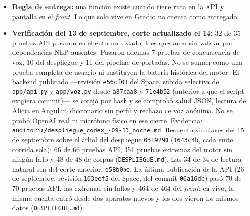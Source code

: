 \documentclass[11pt,a4paper]{article}
\newcommand{\cod}[1]{\texttt{\small #1}}
\begin{document}
\begin{itemize}
        viaja en una cabecera (\cod{X-Lector}) y sus datos siguen en el bucket montado en
        \cod{/data}. Desde el 26 de septiembre, quien entra con usuario y contraseña deja de ser un
        navegador: sus libros, sus palabras y su nivel pasan a ser \textbf{de la cuenta}
        (\cod{cuentas/}\emph{nombre} en el bucket) y se ven igual en el teléfono, la tableta
        o el equipo; sin cuenta siguen siendo de ese navegador. Salió de un caso real: con
        la misma cuenta, el teléfono y la tableta del autor enseñaban dos lectores
        distintos. El primer montaje falló ---el proxy de renderizado en servidor de
        Gradio no dejaba pasar \cod{/api}--- y el segundo, sin ese proxy, es el que está en
        marcha.
  \item \textbf{Regla de entrega:} una función existe cuando tiene ruta en la API
        \textbf{y} pantalla en el \emph{front}. Lo que solo vive en Gradio no cuenta como
        entregado.
  \item \textbf{Verificación del 13 de septiembre, corte actualizado el 14:} 32 de 35
        pruebas API pasaron en el entorno aislado; tres quedaron sin validar por
        dependencias NLP ausentes. Pasaron además 7 pruebas de concurrencia de voz,
        10 del despliegue y 11 del pipeline de portadas. No se suman como una prueba
        completa de usuario ni sustituyen la batería histórica del motor. El backend
        publicado ---revisión \cod{e56cf08} del Space, subida selectiva de \cod{app/api.py} y \cod{app/voz.py} desde \cod{a87caa8} y \cod{71e4b52} (anterior a que el script exigiera commit)--- se
        cotejó por hash y se comprobó salud JSON, lectura de
        Alicia en Angular, diccionario sin perfil y rechazo de voz anónima. No se probó
        OpenAI real ni micrófono físico en ese cierre. Evidencia:
        \cod{auditoria/\allowbreak despliegue\_codex\_-09-13\_noche.md}.
        Recuento sin claves del 15 de septiembre sobre el árbol del despliegue
        \cod{0319290} (\cod{1643c4b}, cada suite corrida sola): 66 de 66 pruebas API,
        351 pruebas extremas del motor sin ningún fallo y 48 de 48 de corpus
        (\cod{DESPLIEGUE.md}). Las 34 de 34 de lectura natural son del corte anterior,
        \cod{d58b0be}. La última publicación de la API (26 de septiembre, revisión
        \cod{103eef5} del Space, del commit \cod{06a16db}) pasó 70 de 70 pruebas API, las
        extremas sin fallos y 464 de 464 del \emph{front}; en vivo, la misma cuenta entró
        desde dos aparatos nuevos y los dos vieron los mismos datos (\cod{DESPLIEGUE.md}).
\end{itemize}
\end{document}

